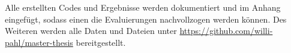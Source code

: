 Alle erstellten Codes und Ergebnisse werden dokumentiert und im Anhang eingefügt, sodass einen die Evaluierungen nachvollzogen werden können. Des Weiteren werden alle Daten und Dateien unter \href{https://github.com/willi-pahl/master-thesis}{https://github.com/willi-pahl/master-thesis} bereitgestellt.\vspace{0.2cm}


